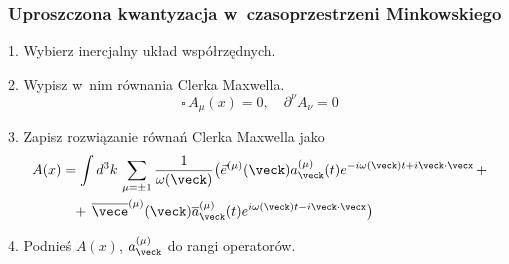 \documentclass[10pt,t]{beamer}
\begin{document}
\begin{frame}
  \frametitle{Uproszczona kwantyzacja w~czasoprzestrzeni Minkowskiego}


  1. Wybierz inercjalny układ współrzędnych.

  2. Wypisz w~nim równania Clerka Maxwella.
  \begin{equation}
    \label{eq:Niespodziewane-teoretyczne-03}
    \square \, A_{ \mu }( x ) = 0, \quad
    \partial^{ \nu } A_{ \nu } = 0
  \end{equation}

  3. Zapisz rozwiązanie równań Clerka Maxwella jako
  \begin{equation}
    \label{eq:Niespodziewane-teoretyczne-04}
    \begin{split}
      A( x )
      &=
        \int d^{ 3 }k \, \sum_{ \mu = \pm 1 } \frac{ 1 }{ \omega( \veck ) }
        \big( \vec{ e }^{ ( \mu ) }( \veck ) a_{ \veck }^{ ( \mu ) }( t )
        e^{ -i \omega( \veck ) t + i \veck \cdot \vecx } \, + \\
      &\hphantom{=} + \, \overline{ \vece }^{ ( \mu ) }( \veck )
        \overline{ a }_{ \veck }^{ ( \mu ) }( t )
        e^{ i \omega( \veck ) t - i \veck \cdot \vecx } \big)
    \end{split}
  \end{equation}

  4. Podnieś $A( x )$, $a_{ \veck }^{ ( \mu ) }$ do rangi operatorów.

\end{frame}
\end{document}

